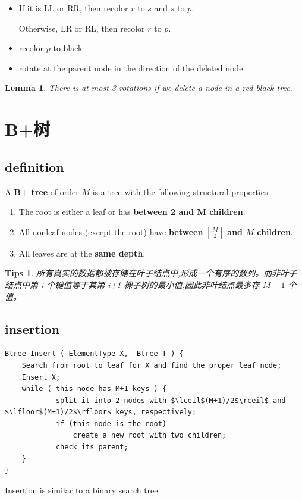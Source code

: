 \documentclass{article}
\newtheorem*{Lemma}{Lemma}
\newtheorem*{Tips}{Tips}
\begin{document}
\begin{itemize}
\begin{itemize}
\begin{itemize}
                \begin{itemize}
                    \item If it is LL or RR, then recolor $r$ to $s$ and $s$ to $p$.\par
                        Otherwise, LR or RL, then recolor $r$ to $p$.
                    \item recolor $p$ to black
                    \item rotate at the parent node in the direction of the deleted node
                \end{itemize}
            \end{itemize}
        \end{itemize}
\end{itemize}

\begin{Lemma}
    There is at most 3 rotations if we delete a node in a red-black tree.
\end{Lemma}

\section{B+树}
\subsection{definition}
A \textbf{B+ tree} of order  $M$ is a tree with the following structural properties: 
\begin{enumerate}
    \item The root is either a leaf or has \textbf{between 2 and M children}. 
    \item All nonleaf nodes (except the root) have \textbf{between $\left \lceil \frac{M}{2} \right \rceil $ and $M$ children}. 
    \item All leaves are at the \textbf{same depth}. 
\end{enumerate}

\begin{Tips}
    所有真实的数据都被存储在叶子结点中,形成一个有序的数列。而非叶子结点中第 i 个键值等于其第 i+1 棵子树的最小值,因此非叶结点最多存 $M-1$ 个值。
\end{Tips}

\subsection{insertion}

\begin{lstlisting}[mathescape]
Btree Insert ( ElementType X,  Btree T ) { 
	Search from root to leaf for X and find the proper leaf node;
	Insert X;
	while ( this node has M+1 keys ) {
    		split it into 2 nodes with $\lceil$(M+1)/2$\rceil$ and $\lfloor$(M+1)/2$\rfloor$ keys, respectively;
    		if (this node is the root)
        		create a new root with two children;
    		check its parent;
	}
} 
\end{lstlisting}
Insertion is similar to a binary search tree.
\end{document}
